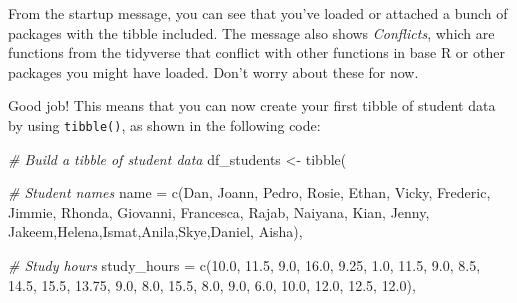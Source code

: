 \documentclass[
]{article}
\newenvironment{Shaded}{\begin{snugshade}}{\end{snugshade}}
\newcommand{\AttributeTok}[1]{\textcolor[rgb]{0.77,0.63,0.00}{#1}}
\newcommand{\CommentTok}[1]{\textcolor[rgb]{0.56,0.35,0.01}{\textit{#1}}}
\newcommand{\FloatTok}[1]{\textcolor[rgb]{0.00,0.00,0.81}{#1}}
\newcommand{\FunctionTok}[1]{\textcolor[rgb]{0.00,0.00,0.00}{#1}}
\newcommand{\NormalTok}[1]{#1}
\newcommand{\OtherTok}[1]{\textcolor[rgb]{0.56,0.35,0.01}{#1}}
\newcommand{\StringTok}[1]{\textcolor[rgb]{0.31,0.60,0.02}{#1}}
\begin{document}
From the startup message, you can see that you've loaded or attached a
bunch of packages with the tibble included. The message also shows
\emph{Conflicts}, which are functions from the tidyverse that conflict
with other functions in base R or other packages you might have loaded.
Don't worry about these for now.

Good job! This means that you can now create your first tibble of
student data by using \texttt{tibble()}, as shown in the following code:

\begin{Shaded}
\begin{Highlighting}[]
\CommentTok{\# Build a tibble of student data}
\NormalTok{df\_students }\OtherTok{\textless{}{-}} \FunctionTok{tibble}\NormalTok{(}
  
  \CommentTok{\# Student names}
  \AttributeTok{name =} \FunctionTok{c}\NormalTok{(}\StringTok{\textquotesingle{}Dan\textquotesingle{}}\NormalTok{, }\StringTok{\textquotesingle{}Joann\textquotesingle{}}\NormalTok{, }\StringTok{\textquotesingle{}Pedro\textquotesingle{}}\NormalTok{, }\StringTok{\textquotesingle{}Rosie\textquotesingle{}}\NormalTok{, }\StringTok{\textquotesingle{}Ethan\textquotesingle{}}\NormalTok{, }\StringTok{\textquotesingle{}Vicky\textquotesingle{}}\NormalTok{,}
           \StringTok{\textquotesingle{}Frederic\textquotesingle{}}\NormalTok{, }\StringTok{\textquotesingle{}Jimmie\textquotesingle{}}\NormalTok{, }\StringTok{\textquotesingle{}Rhonda\textquotesingle{}}\NormalTok{, }\StringTok{\textquotesingle{}Giovanni\textquotesingle{}}\NormalTok{,}
           \StringTok{\textquotesingle{}Francesca\textquotesingle{}}\NormalTok{, }\StringTok{\textquotesingle{}Rajab\textquotesingle{}}\NormalTok{, }\StringTok{\textquotesingle{}Naiyana\textquotesingle{}}\NormalTok{, }\StringTok{\textquotesingle{}Kian\textquotesingle{}}\NormalTok{, }\StringTok{\textquotesingle{}Jenny\textquotesingle{}}\NormalTok{,}
           \StringTok{\textquotesingle{}Jakeem\textquotesingle{}}\NormalTok{,}\StringTok{\textquotesingle{}Helena\textquotesingle{}}\NormalTok{,}\StringTok{\textquotesingle{}Ismat\textquotesingle{}}\NormalTok{,}\StringTok{\textquotesingle{}Anila\textquotesingle{}}\NormalTok{,}\StringTok{\textquotesingle{}Skye\textquotesingle{}}\NormalTok{,}\StringTok{\textquotesingle{}Daniel\textquotesingle{}}\NormalTok{,}
           \StringTok{\textquotesingle{}Aisha\textquotesingle{}}\NormalTok{),}
  
  \CommentTok{\# Study hours}
  \AttributeTok{study\_hours =} \FunctionTok{c}\NormalTok{(}\FloatTok{10.0}\NormalTok{, }\FloatTok{11.5}\NormalTok{, }\FloatTok{9.0}\NormalTok{, }\FloatTok{16.0}\NormalTok{, }\FloatTok{9.25}\NormalTok{, }\FloatTok{1.0}\NormalTok{, }\FloatTok{11.5}\NormalTok{, }\FloatTok{9.0}\NormalTok{,}
                 \FloatTok{8.5}\NormalTok{, }\FloatTok{14.5}\NormalTok{, }\FloatTok{15.5}\NormalTok{, }\FloatTok{13.75}\NormalTok{, }\FloatTok{9.0}\NormalTok{, }\FloatTok{8.0}\NormalTok{, }\FloatTok{15.5}\NormalTok{, }\FloatTok{8.0}\NormalTok{,}
                 \FloatTok{9.0}\NormalTok{, }\FloatTok{6.0}\NormalTok{, }\FloatTok{10.0}\NormalTok{, }\FloatTok{12.0}\NormalTok{, }\FloatTok{12.5}\NormalTok{, }\FloatTok{12.0}\NormalTok{),}
  

\end{Highlighting}
\end{Shaded}
\end{document}

